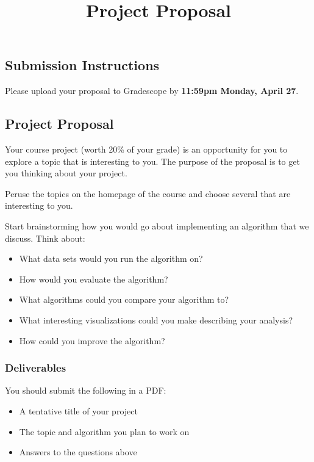 \documentclass{article}
\title{Project Proposal}
\author{} %
\date{}
\begin{document}
\maketitle

\subsection*{Submission Instructions}
Please upload your proposal to Gradescope by \textbf{11:59pm Monday, April 27}.

\subsection*{Project Proposal}

Your course project (worth 20\% of your grade) is an opportunity for you to explore a topic that is interesting to you.
The purpose of the proposal is to get you thinking about your project.

Peruse the topics on the homepage of the course and choose several that are interesting to you.

Start brainstorming how you would go about implementing an algorithm that we discuss.
Think about:
\begin{itemize}
    \item What data sets would you run the algorithm on?
    \item How would you evaluate the algorithm?
    \item What algorithms could you compare your algorithm to?
    \item What interesting visualizations could you make describing your analysis?
    \item How could you improve the algorithm?
\end{itemize}

\subsubsection*{Deliverables}

You should submit the following in a PDF:
\begin{itemize}
    \item A tentative title of your project
    \item The topic and algorithm you plan to work on
    \item Answers to the questions above 
\end{itemize}
\end{document}
